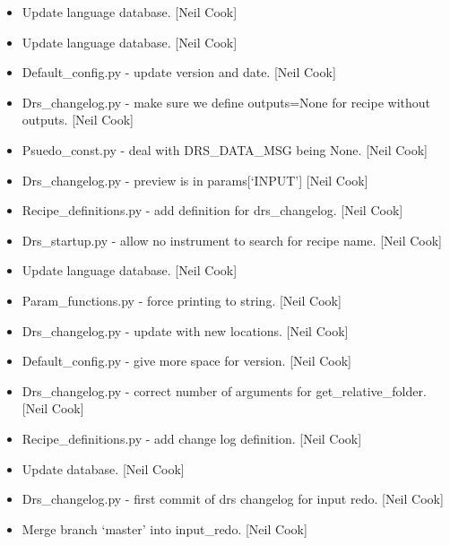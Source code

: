\documentclass[a4paper,10pt,english]{report}
\begin{document}
\begin{itemize}
\item {} 
Update language database. {[}Neil Cook{]}

\item {} 
Update language database. {[}Neil Cook{]}

\item {} 
Default\_config.py - update version and date. {[}Neil Cook{]}

\item {} 
Drs\_changelog.py - make sure we define outputs=None for recipe without
outputs. {[}Neil Cook{]}

\item {} 
Psuedo\_const.py - deal with DRS\_DATA\_MSG being None. {[}Neil Cook{]}

\item {} 
Drs\_changelog.py - preview is in params{[}‘INPUT’{]} {[}Neil Cook{]}

\item {} 
Recipe\_definitions.py - add definition for drs\_changelog. {[}Neil Cook{]}

\item {} 
Drs\_startup.py - allow no instrument to search for recipe name. {[}Neil
Cook{]}

\item {} 
Update language database. {[}Neil Cook{]}

\item {} 
Param\_functions.py - force printing to string. {[}Neil Cook{]}

\item {} 
Drs\_changelog.py - update with new locations. {[}Neil Cook{]}

\item {} 
Default\_config.py - give more space for version. {[}Neil Cook{]}

\item {} 
Drs\_changelog.py - correct number of arguments for
get\_relative\_folder. {[}Neil Cook{]}

\item {} 
Recipe\_definitions.py - add change log definition. {[}Neil Cook{]}

\item {} 
Update database. {[}Neil Cook{]}

\item {} 
Drs\_changelog.py - first commit of drs changelog for input redo. {[}Neil
Cook{]}

\item {} 
Merge branch ‘master’ into input\_redo. {[}Neil Cook{]}


\end{itemize}
\end{document}
